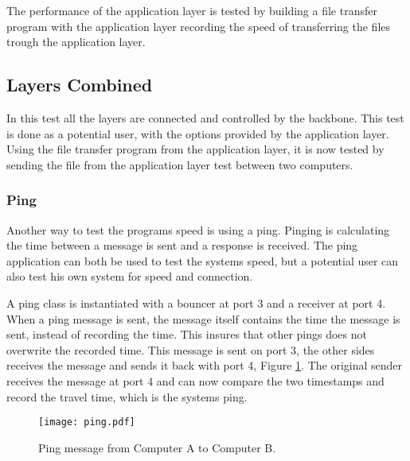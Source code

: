 The performance of the application layer is tested by building a file transfer program with the application layer recording the speed of transferring the files trough the application layer.

\subsection{Layers Combined}

In this test all the layers are connected and controlled by the backbone. This test is done as a potential user, with the options provided by the application layer. Using the file transfer program from the application layer, it is now tested by sending the file from the application layer test between two computers. 
\subsubsection{Ping}
Another way to test the programs speed is using a ping. Pinging is calculating the time between a message is sent and a response is received. The ping application can both be used to test the systems speed, but a potential user can also test his own system for speed and connection.

A ping class is instantiated with a bouncer at port 3 and a receiver at port 4. When a ping message is sent, the message itself contains the time the message is sent, instead of recording the time. This insures that other pings does not overwrite the recorded time. This message is sent on port 3, the other sides receives the message and sends it back with port 4, Figure \ref{fig:ping}. The original sender receives the message at port 4 and can now compare the two timestamps and record the travel time, which is the systems ping.


\begin{figure}[htb]
	\begin{center}
	\texttt{[image: ping.pdf]}%
	\caption{Ping message from Computer A to Computer B.}
	\label{fig:ping}	
	\end{center}
\end{figure}

